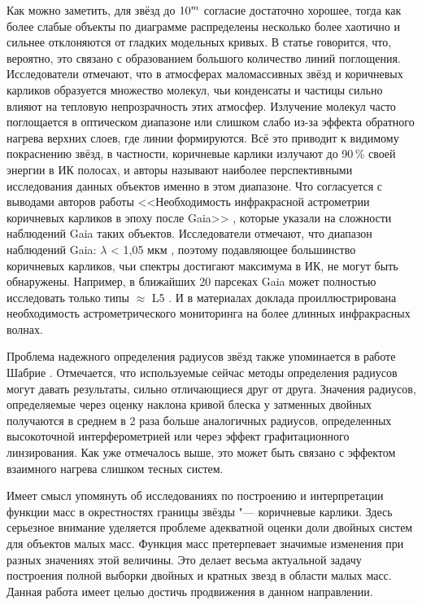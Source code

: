 Как можно заметить, для звёзд до \(\textup{10}^m\) согласие достаточно хорошее, тогда как более слабые объекты по диаграмме распределены несколько более хаотично и сильнее отклоняются от гладких модельных кривых. В статье говорится, что, вероятно, это связано с образованием большого количество линий поглощения. Исследователи отмечают, что в атмосферах маломассивных звёзд и коричневых карликов образуется множество молекул, чьи конденсаты и частицы сильно влияют на тепловую непрозрачность этих атмосфер. Излучение молекул часто поглощается в оптическом диапазоне или слишком слабо из-за эффекта обратного нагрева верхних слоев, где линии формируются. Всё это приводит к видимому покраснению звёзд, в частности, коричневые карлики излучают до 90\,\% своей энергии в ИК полосах, и авторы называют наиболее перспективными исследования данных объектов именно в этом диапазоне. Что согласуется с выводами авторов работы <<Необходимость инфракрасной астрометрии коричневых карликов в эпоху после Gaia>> , которые указали на сложности наблюдений Gaia таких объектов. Исследователи отмечают, что диапазон наблюдений Gaia: $\lambda$ < 1,05 мкм , поэтому подавляющее большинство коричневых карликов, чьи спектры достигают максимума в ИК, не могут быть обнаружены. Например, в ближайших 20 парсеках Gaia может полностью исследовать только типы $\approx$ L5 . И в материалах доклада проиллюстрирована необходимость астрометрического мониторинга на более длинных инфракрасных волнах.

Проблема надежного определения радиусов звёзд также упоминается в работе Шабрие . Отмечается, что используемые сейчас методы определения радиусов могут давать результаты, сильно отличающиеся друг от друга. Значения радиусов, определяемые через оценку наклона кривой блеска у затменных двойных получаются в среднем в 2 раза больше аналогичных радиусов, определенных высокоточной интерферометрией или через эффект графитационного линзирования. Как уже отмечалось выше, это может быть связано с эффектом взаимного нагрева слишком тесных систем.

Имеет смысл упомянуть об исследованиях по построению и интерпретации функции масс в окрестностях границы \glqq звёзды "--- коричневые карлики\grqq {}. Здесь серьезное внимание уделяется проблеме адекватной оценки доли двойных систем для объектов малых масс. Функция масс претерпевает значимые изменения при разных значениях этой величины.  Это делает весьма актуальной задачу построения полной выборки двойных и кратных звезд в области малых масс. Данная работа имеет целью достичь продвижения в данном направлении.

